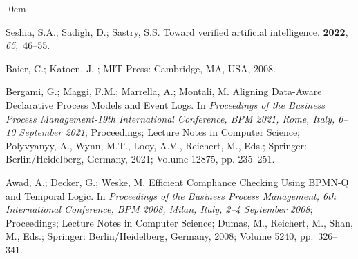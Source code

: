 \documentclass[information,article,accept,pdftex,oneauthor]{Definitions/mdpi}
\begin{document}
\begin{adjustwidth}{-\extralength}{0cm}



%

\begin{thebibliography}{999}

Seshia, S.A.; Sadigh, D.; Sastry, S.S.
\newblock Toward verified artificial intelligence.
 {\bf 2022}, {\em 65},~46--55.

Baier, C.; Katoen, J.
; {MIT} Press:  {Cambridge, MA, USA,} %
 2008.

Bergami, G.; Maggi, F.M.; Marrella, A.; Montali, M.
\newblock Aligning Data-Aware Declarative Process Models and Event Logs.
\newblock In \emph{Proceedings of the Business Process Management-19th
  International Conference, {BPM} 2021, Rome, Italy, 6--10 September 2021};
  Proceedings; Lecture Notes in Computer Science; Polyvyanyy, A., Wynn, M.T., Looy, A.V., Reichert, M., Eds.;
  Springer:  {Berlin/Heidelberg, Germany,} 2021; Volume 12875,  pp.  235--251.

Awad, A.; Decker, G.; Weske, M.
\newblock Efficient Compliance Checking Using {BPMN-Q} and Temporal Logic.
\newblock In \emph{Proceedings of the Business Process Management, 6th International
  Conference, {BPM} 2008, Milan, Italy, 2--4 September 2008}; Proceedings;  Lecture Notes in Computer Science;
  Dumas, M., Reichert, M., Shan, M., Eds.; Springer: {Berlin/Heidelberg, Germany,}  2008; Volume 5240,  \mbox{pp. 326--341}.


\end{thebibliography}
\end{adjustwidth}
\end{document}
